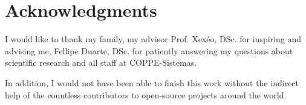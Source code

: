 \chapter*{Acknowledgments}

I would like to thank my family, my advisor Prof. Xexéo, DSc. for inspiring and advising me, Fellipe Duarte, DSc. for patiently answering my questions about scientific research and all staff at COPPE-Sistemas. 

In addition, I would not have been able to finish this work without the indirect help of the countless contributors to open-source projects around the world.